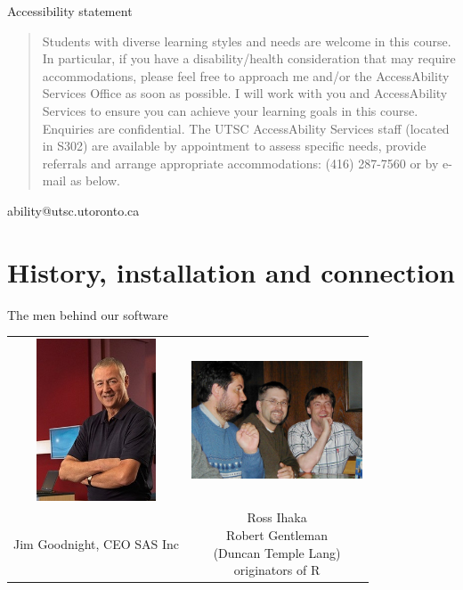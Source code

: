 \documentclass[unknownkeysallowed]{beamer}\usepackage[]{graphicx}\usepackage[]{color}
\begin{document}
\begin{frame}[fragile]{Accessibility statement}

  \begin{quote}
   Students with diverse learning styles and needs are welcome in this
course. In particular, if you have a disability/health consideration
that may require accommodations, please feel free to approach me
and/or the AccessAbility Services Office as soon as possible. I will
work with you and AccessAbility Services to ensure you can achieve
your learning goals in this course. Enquiries are confidential. The
UTSC AccessAbility Services staff (located in S302) are available by
appointment to assess specific needs, provide referrals and arrange
appropriate accommodations: (416) 287-7560 or by e-mail as below.
  \end{quote}

  \begin{semiverbatim}
    ability@utsc.utoronto.ca
  \end{semiverbatim}
  
\end{frame}

 


\section{History, installation and connection}

\frame{\sectionpage}




\begin{frame}{The men behind our software}

  \begin{tabular}{cc}
    \includegraphics[width=1.4in]{goodnight}
    & \includegraphics[width=2in]{ihaka} \\
    Jim Goodnight, CEO SAS Inc & \pbox{10cm}{Ross Ihaka\\ Robert Gentleman\\ (Duncan
    Temple Lang)\\ originators of R}
  \end{tabular}
  
\end{frame}
\end{document}
